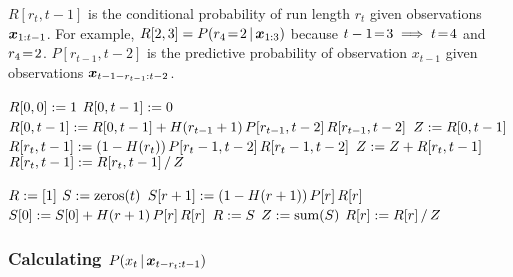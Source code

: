\documentclass[10pt,english,oneside]{article}
\begin{document}
\begin{algorithm}[t]
  \caption[]{$R[r_t, t-1]$ is the conditional probability of run
    length $r_t$ given observations $\boldsymbol{x}_{1:t-1}$. For example,
    $R[2,3] = P(r_4 \!=\! 2 \,|\, \boldsymbol{x}_{1:3})$ because $t - 1 \!=\! 3
    \implies t \!=\! 4$ and $r_4 \!=\! 2$. $P[r_{t-1}, t-2]$ is the
    predictive probability of observation $x_{t-1}$ given observations
    $\boldsymbol{x}_{t-1-r_{t-1}:t-2}$.}
  \label{alg:conditional}
  \begin{algorithmic}[0]
    \State {}
    \Statex
    \State $R[0,0] := 1$
    \Statex
    \State {}
    \Statex
    \State $R[0,t-1] := 0$
    \State $R[0,t-1] := R[0,t-1] +
    H(r_{t-1}+1)\,P[r_{t-1},t-2]\,R[r_{t-1},t-2]$
    \EndFor
    \State $Z := R[0,t-1]$
    \State $R[r_t, t-1] := (1 - H(r_t))\,P[r_t-1,t-2]\,R[r_t-1, t-2]$
    \State $Z := Z + R[r_t,t-1]$
    \EndFor
    \Statex
    \State {}
    \Statex
    \State $R[r_t, t-1] := R[r_t, t-1] \,/\, Z$
    \EndFor
    \EndFor
  \end{algorithmic}
\end{algorithm}

\begin{algorithm}[t]
  \caption[]{}
  \label{alg:conditional2}
  \begin{algorithmic}[0]
    \State {}
    \Statex
    \State $R := [ 1 ]$
    \Statex
    \State {}
    \Statex
    \State $S := \textrm{zeros}(t)$
    \State $S[r+1] := (1 - H(r+1))\,P[r]\,R[r]$
    \EndFor
    \State $S[0] := S[0] +
    H(r+1)\,P[r]\,R[r]$
    \EndFor
    \State $R := S$
    \State $Z := \textrm{sum}(S)$
    \Statex
    \State {}
    \Statex
    \State $R[r] := R[r] \,/\, Z$
    \EndFor
    \EndFor
  \end{algorithmic}
\end{algorithm}

\subsubsection{Calculating $P(x_t \,|\, \boldsymbol{x}_{t-r_t:t-1})$}
\end{document}

